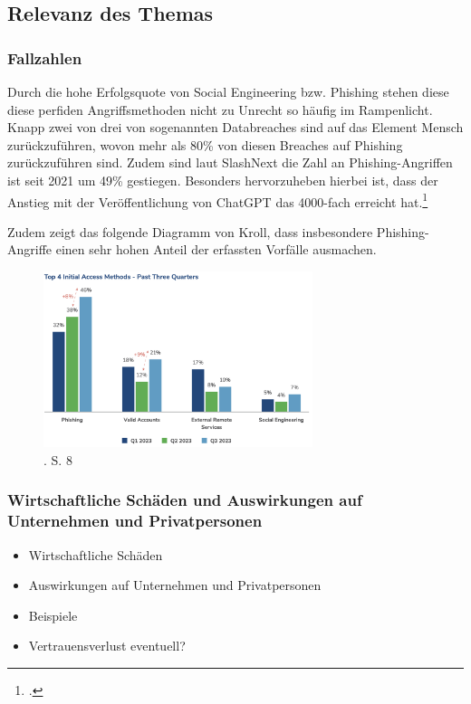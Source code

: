 \documentclass[12pt, a4paper, oneside]{scrartcl}
\begin{document}
\subsection{Relevanz des Themas}

\subsubsection{Fallzahlen}
Durch die hohe Erfolgsquote von Social Engineering bzw. Phishing stehen diese diese perfiden 
Angriffsmethoden nicht zu Unrecht so häufig im Rampenlicht. Knapp zwei von drei von sogenannten 
Databreaches sind auf das Element Mensch zurückzuführen, wovon mehr als 80\% von diesen Breaches
auf Phishing zurückzuführen sind. Zudem sind laut SlashNext die Zahl an Phishing-Angriffen ist
seit 2021 um 49\% gestiegen. Besonders hervorzuheben hierbei ist, dass der Anstieg mit der 
Veröffentlichung von ChatGPT das 4000-fach erreicht hat.\footcite{HoxHunt_Report}
\par
Zudem zeigt das folgende Diagramm von Kroll, dass insbesondere Phishing-Angriffe einen sehr 
hohen Anteil der erfassten Vorfälle ausmachen.
\begin{figure}[H]
    \centering
    \includegraphics[width=0.7\textwidth]{Kroll_Statistics_AccessMethods.png}
    \caption{\cite{Kroll_Numbers}. S. 8}
\end{figure}

\subsubsection{Wirtschaftliche Schäden und Auswirkungen auf Unternehmen und Privatpersonen}
\begin{itemize}
  \item Wirtschaftliche Schäden
  \item Auswirkungen auf Unternehmen und Privatpersonen
  \item Beispiele
  \item Vertrauensverlust eventuell?
\end{itemize}
\end{document}
